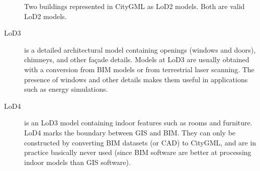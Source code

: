 \begin{description}
\begin{marginfigure}
    \caption{Two buildings represented in CityGML as LoD2 models. Both are valid LoD2 models.}%
  \label{fig:lod_ambiguity}
  \end{marginfigure}
  \item[LoD3] is a detailed architectural model containing openings (windows and doors), chimneys, and other façade details.
  Models at LoD3 are usually obtained with a conversion from BIM models or from terrestrial laser scanning.
  The presence of windows and other details makes them useful in applications such as energy simulations.
  \item[LoD4] is an LoD3 model containing indoor features such as rooms and furniture.
  LoD4 marks the boundary between GIS and BIM\@.
  They can only be constructed by converting BIM datasets (or CAD) to CityGML, and are in practice basically never used (since BIM software are better at processing indoor models than GIS software).
\end{description}

%


